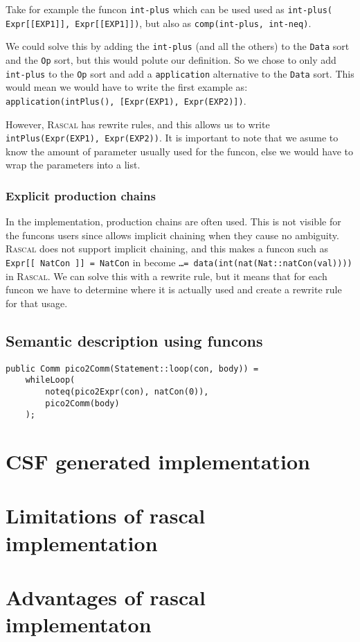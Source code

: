 \documentclass[a4paper, oneside, notitlepage]{article}
\newcommand{\Rascal}{\textsc{Rascal}\xspace}
\newcommand{\ASFSDF}{\textsmaller{ASF-SDF}\xspace}
\newcommand{\ASF}{\textsmaller{ASF}\xspace}
\newcommand{\ADT}{\textsmaller{ADT}\xspace}
\newcommand{\code}[1]{\texttt{#1}\xspace}
\begin{document}
		Take for example the funcon \code{int-plus} which can be used used as 
		\code{int-plus(	Expr[[EXP1]], Expr[[EXP1]])}, 
		but also as 
		\code{comp(int-plus, int-neq)}.

		We could solve this by adding the \code{int-plus} (and all the others)
		to the \code{Data} sort and the \code{Op} sort, but this would
		polute our \ADT definition.
		So we chose to only add \code{int-plus} to the \code{Op} sort and add a
		\code{application} alternative to the \code{Data} sort.
		This would mean we would have to write the first example as:
		\code{application(intPlus(), [Expr(EXP1), Expr(EXP2)])}.

		However, \Rascal has rewrite rules, and this allows us to write 
		\code{intPlus(Expr(EXP1), Expr(EXP2))}.
		It is important to note that we asume to know the amount of parameter
		usually used for the funcon, else we would have to wrap the parameters
		into a list.

		\subsubsection{Explicit production chains}
		In the \ASFSDF implementation, production chains are often used.
		This is not visible for the funcons users since \ASFSDF allows implicit
		chaining when they cause no ambiguity.
		\Rascal does not support implicit chaining, and this makes a funcon such
		as \code{Expr[[ NatCon ]] = NatCon} in \ASF become 
		\code{\ldots = data(int(nat(Nat::natCon(val))))} in \Rascal.
		We can solve this with a rewrite rule, but it means that for each funcon
		we have to determine where it is actually used and create a rewrite rule
		for that usage.
	
	\subsection{Semantic description using funcons}
	

	\begin{lstlisting}
public Comm pico2Comm(Statement::loop(con, body)) =
	whileLoop( 
		noteq(pico2Expr(con), natCon(0)), 
		pico2Comm(body)
	);
	\end{lstlisting}


\section{CSF generated implementation}

\section{Limitations of rascal implementation}

\section{Advantages of rascal implementaton}
\end{document}
